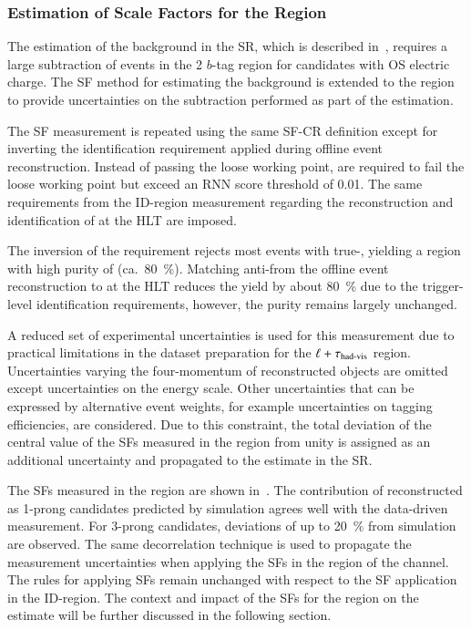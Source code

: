 \subsubsection{Estimation of \Faketauhadvis Scale Factors for the \antiid
  Region}

The estimation of the \multijet background in the \hadhad SR, which is described
in~, requires a large subtraction of \ttbarFakes events
in the 2 $b$-tag \antiid region for \tauhadvis candidates with OS electric
charge. The SF method for estimating the \ttbarFakes background is extended to
the \antiid region to provide uncertainties on the subtraction performed as part
of the \multijet estimation.

The SF measurement is repeated using the same SF-CR definition except for
inverting the \tauhadvis identification requirement applied during offline event
reconstruction. Instead of \tauhadvis passing the loose \tauid working point,
\tauhadvis are required to fail the loose working point but exceed an RNN \tauid
score threshold of \num{0.01}. The same requirements from the ID-region
measurement regarding the reconstruction and identification of \tauhadvis at the
HLT are imposed.

The inversion of the \tauid requirement rejects most \ttbar events with
true-\tauhadvis, yielding a region with high purity of \ttbarFakes
(ca.~\SI{80}{\percent}). Matching anti-\tauhadvis from the offline event
reconstruction to \tauhadvis at the HLT reduces the \ttbarFakes yield by about
\SI{80}{\percent} due to the trigger-level identification requirements, however,
the \ttbarFakes purity remains largely unchanged.

A reduced set of experimental uncertainties is used for this measurement due to
practical limitations in the dataset preparation for the $\ell + \tau_{\text{had-vis}}$
\antiid region. Uncertainties varying the four-momentum of reconstructed objects
are omitted except uncertainties on the \tauhadvis energy scale. Other
uncertainties that can be expressed by alternative event weights, for example
uncertainties on tagging efficiencies, are considered. Due to this constraint,
the total deviation of the central value of the SFs measured in the \antiid
region from unity is assigned as an additional uncertainty and propagated to the
\multijet estimate in the \hadhad SR.

The SFs measured in the \antiid region are shown
in~. The contribution of \faketauhadvis
reconstructed as 1-prong candidates predicted by simulation agrees well with the
data-driven measurement. For 3-prong candidates, deviations of up to
\SI{20}{\percent} from simulation are observed. The same decorrelation technique
is used to propagate the measurement uncertainties when applying the SFs in the
\antiid region of the \hadhad channel. The rules for applying SFs remain
unchanged with respect to the SF application in the ID-region. The context and
impact of the SFs for the \antiid region on the \multijet estimate will be
further discussed in the following section.

